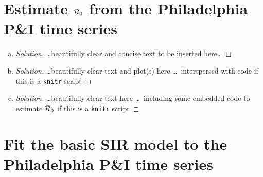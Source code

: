 \documentclass[12pt]{article}
\begin{document}
\section{Estimate ${\cal R}_0$ from the Philadelphia P\&I time series}

\begin{enumerate}[(a)]

\item \EstimateRna

 {\color{blue} \begin{proof}[Solution]
 {\color{magenta}\dots beautifully clear and concise text to be inserted here\dots}
 \end{proof}
 }

\item \EstimateRnb

  {\color{blue} \begin{proof}[Solution]
  {\color{magenta}\dots beautifully clear text and plot(s) here \dots\ interspersed with \Rlogo code if this is a \texttt{knitr} script}
  \end{proof}
  }
  
\item \EstimateRnc

  {\color{blue} \begin{proof}[Solution]
  {\color{magenta}\dots beautifully clear text here \dots\ including some embedded \Rlogo code to estimate ${\cal R}_0$ if this is a \texttt{knitr} script}
  \end{proof}
  }

\end{enumerate}

\section{Fit the basic SIR model to the Philadelphia P\&I time series}
\end{document}
